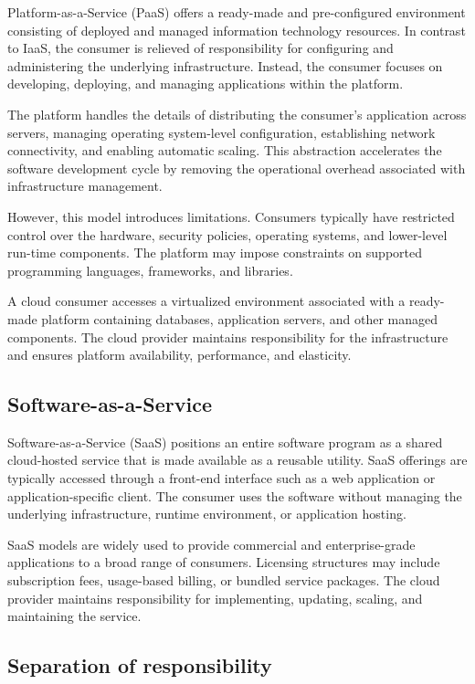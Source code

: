 \documentclass[11pt,a4paper,openany]{report}
\begin{document}
Platform-as-a-Service (PaaS) offers a ready-made and pre-configured environment consisting of deployed and managed information technology resources. In contrast to IaaS, the consumer is relieved of responsibility for configuring and administering the underlying infrastructure. Instead, the consumer focuses on developing, deploying, and managing applications within the platform.

The platform handles the details of distributing the consumer's application across servers, managing operating system-level configuration, establishing network connectivity, and enabling automatic scaling. This abstraction accelerates the software development cycle by removing the operational overhead associated with infrastructure management.

However, this model introduces limitations. Consumers typically have restricted control over the hardware, security policies, operating systems, and lower-level run-time components. The platform may impose constraints on supported programming languages, frameworks, and libraries.

A cloud consumer accesses a virtualized environment associated with a ready-made platform containing databases, application servers, and other managed components. The cloud provider maintains responsibility for the infrastructure and ensures platform availability, performance, and elasticity.

\subsection{Software-as-a-Service}

Software-as-a-Service (SaaS) positions an entire software program as a shared cloud-hosted service that is made available as a reusable utility. SaaS offerings are typically accessed through a front-end interface such as a web application or application-specific client. The consumer uses the software without managing the underlying infrastructure, runtime environment, or application hosting.

SaaS models are widely used to provide commercial and enterprise-grade applications to a broad range of consumers. Licensing structures may include subscription fees, usage-based billing, or bundled service packages. The cloud provider maintains responsibility for implementing, updating, scaling, and maintaining the service.

\subsection{Separation of responsibility}
\end{document}
